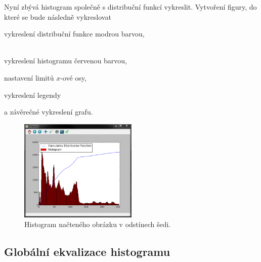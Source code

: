 \documentclass[12pt, a4paper]{article}
\begin{document}
\par{Nyní zbývá histogram společně s distribuční funkcí vykreslit. Vytvoření figury, do které se bude následně vykreslovat

vykreslení distribuční funkce modrou barvou,

~\\
vykreslení histogramu červenou barvou,

nastavení limitů $x$-ové osy,

vykreslení legendy

a závěrečné vykreslení grafu.


\begin{figure}[!ht]
	\centering
	\includegraphics[width=0.5\textwidth]{GS_histogram.png}
	\caption{Histogram načteného obrázku v odstínech šedi.}	
\end{figure}

}






\newpage










\subsection{Globální ekvalizace histogramu}
\end{document}
